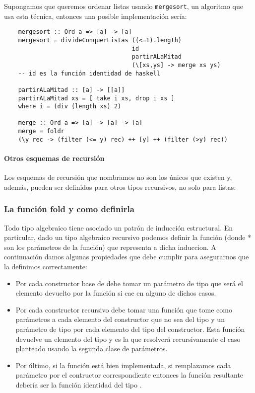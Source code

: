 Supongamos que queremos ordenar listas usando \texttt{mergesort}, un algoritmo que usa esta técnica, entonces una posible implementación sería:

\begin{centrado}
	\begin{verbatim}
	mergesort :: Ord a => [a] -> [a]
	mergesort = divideConquerListas ((<=1).length) 
									id  
									partirALaMitad
									(\[xs,ys] -> merge xs ys)	
	-- id es la función identidad de haskell

	partirALaMitad :: [a] -> [[a]]
	partirALaMitad xs = [ take i xs, drop i xs ] 
	where i = (div (length xs) 2)
	
	merge :: Ord a => [a] -> [a] -> [a]
	merge = foldr 
	(\y rec -> (filter (<= y) rec) ++ [y] ++ (filter (>y) rec))	 
	\end{verbatim}
\end{centrado}


\paragraph{Otros esquemas de recursión} Los esquemas de recursión que nombramos no son los únicos que existen y, además, pueden ser definidos para otros tipos recursivos, no solo para listas.

\subsubsection{La función fold y como definirla}
Todo tipo algebraico tiene asociado un patrón de inducción estructural. En particular, dado un tipo algebraico recursivo  podemos definir la función  (donde * son los parámetros de la función) que representa a dicha induccion. A continuación damos algunas propiedades que debe cumplir  para asegurarnos que la definimos correctamente:
\begin{itemize}
	\item Por cada constructor base de  debe tomar un parámetro de tipo  que será el elemento devuelto por la función si cae en alguno de dichos casos.
	\item Por cada constructor recursivo debe tomar una función que tome como parámetros a cada elemento del constructor que no sea del tipo  y un parámetro de tipo  por cada elemento del tipo   del constructor. Esta función devuelve un elemento del tipo  y es la que resolverá recursivamente el caso planteado usando la segunda clase de parámetros.
	\item Por último, si la función está bien implementada, si remplazamos cada parámetro por el contructor correspondiente entonces la función resultante debería ser la función identidad del tipo .
\end{itemize}


